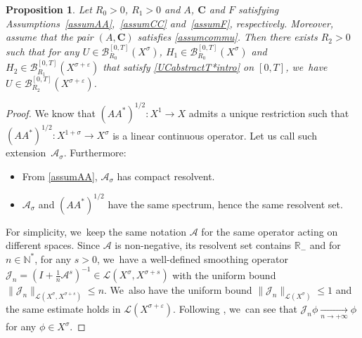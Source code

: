 \documentclass[11pt]{article}
\newtheorem{proposition}[theorem]{Proposition}
\theoremstyle{definition}
\let\mc\mathcal
\let\veps\varepsilon
\newcommand{\A}{\mc{A}}
\newcommand{\B}{\mc{B}}
\newcommand{\J}{\mc{J}}
\newcommand{\R}{\mathbb{R}}
\newcommand{\N}{\mathbb{N}}
\newcommand{\bC}{\boldsymbol{C}}
\providecommand{\norm}[1]{\lVert#1\rVert}
\begin{document}
\begin{proposition}\label{prop:abs-prop-reg}
Let $R_{0}>0$, $R_{1}>0$ and $A$, $\bC$ and $F$ satisfying Assumptions~\ref{assumAA},~\ref{assumCC} and~\ref{assumF}, respectively. Moreover, assume that the pair $(A, \bC)$ satisfies \cref{assumcommu}. Then there exists $R_{2}>0$ such that for any
$U\in \B_{R_{0}}^{[0,T]}(X^{\sigma})$, $H_{1}\in \B_{R_{0}}^{[0,T]}(X^{\sigma})$ and $H_{2}\in \B_{R_{1}}^{[0,T]}(X^{\sigma+\veps})$ that satisfy \eqref{UCabstractT*intro} on $[0,T]$, we~have $U\in \B_{R_{2}}^{[0,T]}(X^{\sigma+\veps})$.
\end{proposition}
\begin{proof}

We know that $(AA^*)^{1/2}: X^1\to X$ admits a unique restriction such that $(AA^*)^{1/2}: X^{1+\sigma}\to X^{\sigma}$ is a linear continuous operator. Let us call such extension~$\A_\sigma$. Furthermore:
\begin{itemize}
\item From \cref{assumAA}, $\A_\sigma$ has compact resolvent.
\item $\A_\sigma$ and $(AA^*)^{1/2}$ have the same spectrum, hence the same resolvent set.
\end{itemize}
For simplicity, we~keep the same notation $\A$ for the same operator acting on different spaces. Since $\A$ is non-negative, its resolvent set contains $\R_-$ and for $n\in \N^*$, for any $s>0$, we~have a well-defined smoothing operator $\mc{J}_n=(I+\frac{1}{n}\A^s)^{-1}\in \mc{L}(X^\sigma, X^{\sigma+s})$ with the uniform bound $\norm{\mc{J}_n}_{\mc{L}(X^\sigma, X^{\sigma+s})}\leq n$. We~also have the uniform bound $\norm{\mc{J}_n}_{\mc{L}(X^\sigma)}\leq 1$ and the same estimate holds in $\mc{L}(X^{\sigma+\veps})$. Following \cite[Prop.\,2.3.4]{TW:09}, we~can see that $\J_n \phi\underset{n\to+\infty}{\to} \phi$ for any $\phi\in X^\sigma$.


\end{proof}
\end{document}
